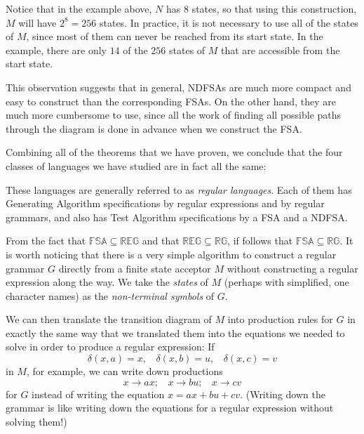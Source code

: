 \documentclass{article}
\begin{document}
Notice that in the example above, $N$ has 8 states, so that using this construction, $M$ will have $2^8 = 256$ states. In practice, it is not necessary to use all of the states of $M$, since most of them can never be reached from its start state. In the example, there are only $14$ of the $256$ states of $M$ that are accessible from the start state. 

This observation suggests that in general, NDFSAs are much more compact and easy to construct than the corresponding FSAs. On the other hand, they are much more cumbersome to use, since all the work of finding all possible paths through the diagram is done in advance when we construct the FSA.

Combining all of the theorems that we have proven, we conclude that the four classes of languages we have studied are in fact all the same:

\begin{center}
\end{center}

These languages are generally referred to as \emph{regular languages}. Each of them has Generating Algorithm specifications by regular expressions and by regular grammars, and also has Test Algorithm specifications by a FSA and a NDFSA.

From the fact that $\mathbb{FSA} \subseteq \mathbb{REG}$ and that $\mathbb{REG} \subseteq \mathbb{RG}$, if follows that $\mathbb{FSA} \subseteq \mathbb{RG}$. It is worth noticing that there is a very simple algorithm to construct a regular grammar $G$ directly from a finite state acceptor $M$ without constructing a regular expression along the way. We take the \emph{states} of $M$ (perhaps with simplified, one character names) as the \emph{non-terminal symbols} of $G$.

We can then translate the transition diagram of $M$ into production rules for $G$ in exactly the same way that we translated them into the equations we needed to solve in order to produce a regular expression: If
\begin{equation*}
\delta(x,a) = x, \ \ \ \ \delta(x,b) = u, \ \ \ \ \delta(x,c) = v
\end{equation*}
in $M$, for example, we can write down productions
\begin{equation*}
x \to ax; \ \ \ \ x \to bu; \ \ \ \ x \to cv
\end{equation*}
for $G$ instead of writing the equation $x = ax + bu + cv$. (Writing down the grammar is like writing down the equations for a regular expression without solving them!)
\end{document}
